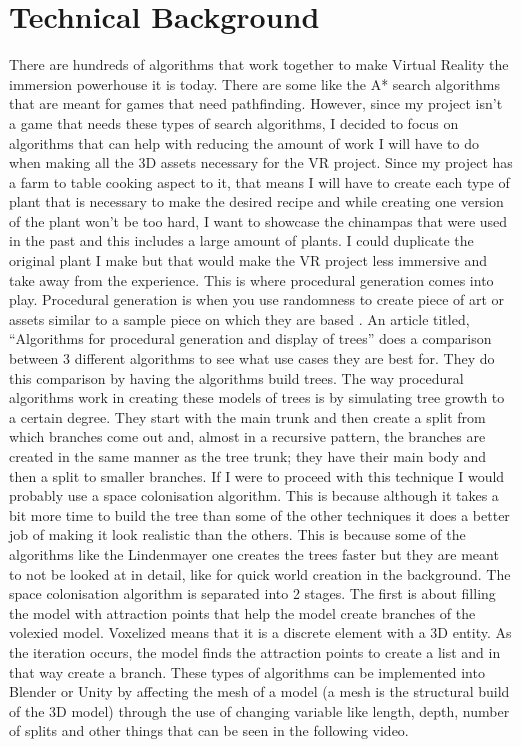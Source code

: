 \documentclass[10pt,twocolumn]{article}
\begin{document}
\section{Technical Background}
There are hundreds of algorithms that work together to make Virtual Reality the immersion powerhouse it is today. There are some like the A* search algorithms that are meant for games that need pathfinding. However, since my project isn’t a game that needs these types of search algorithms, I decided to focus on algorithms that can help with reducing the amount of work I will have to do when making all the 3D assets necessary for the VR project. Since my project has a farm to table cooking aspect to it, that means I will have to create each type of plant that is necessary to make the desired recipe and while creating one version of the plant won’t be too hard, I want to showcase the chinampas that were used in the past and this includes a large amount of plants. I could duplicate the original plant I make but that would make the VR project less immersive and take away from the experience. This is where procedural generation comes into play. Procedural generation is when you use randomness to create piece of art or assets similar to a sample piece on which they are based \cite{buildproceduralgen2016}. An article titled, “Algorithms for procedural generation and display of trees” does a comparison between 3 different algorithms to see what use cases they are best for\cite{proceduralgen2019}. They do this comparison by having the algorithms build trees. The way procedural algorithms work in creating these models of trees is by simulating tree growth to a certain degree. They start with the main trunk and then create a split from which branches come out and, almost in a recursive pattern, the branches are created in the same manner as the tree trunk; they have their main body and then a split to smaller branches. If I were to proceed with this technique I would probably use a space colonisation algorithm. This is because although it takes a bit more time to build the tree than some of the other techniques it does a better job of making it look realistic than the others. This is because some of the algorithms like the Lindenmayer one creates the trees faster but they are meant to not be looked at in detail, like for quick world creation in the background. The space colonisation algorithm is separated into 2 stages. The first is about filling the model with attraction points that help the model create branches of the volexied model. Voxelized means that it is a discrete element with a 3D entity. As the iteration occurs, the model finds the attraction points to create a list and in that way create a branch. These types of algorithms can be implemented into Blender or Unity by affecting the mesh of a model (a mesh is the structural build of the 3D model) through the use of changing variable like length, depth,  number of splits and other things that can be seen in the following video.
\end{document}
